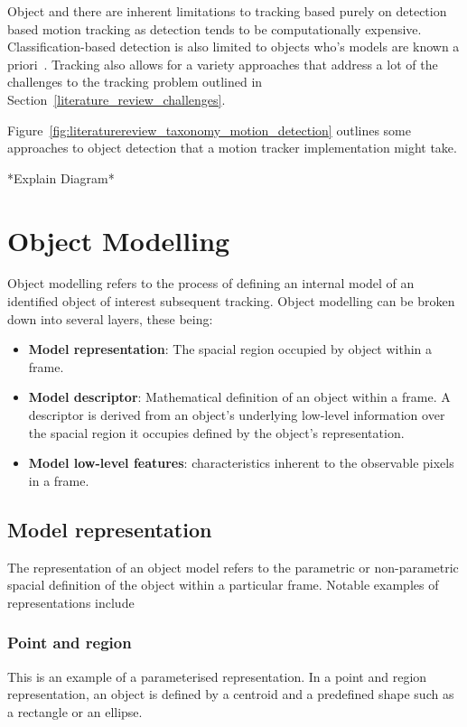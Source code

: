 Object and there are inherent limitations to tracking based purely on
detection based motion tracking as detection tends to be computationally
expensive. Classification-based detection is also limited to objects who's
models are known a priori~\cite{Forsyth2012}.
Tracking also allows for a variety approaches that address a lot of the
challenges to the tracking problem outlined in
Section~\ref{literature_review_challenges}.

Figure~\ref{fig:literaturereview_taxonomy_motion_detection} outlines some
approaches to object detection that a motion tracker implementation might take.


*Explain Diagram*

\section{Object Modelling}\label{literature_review_object_modelling}
Object modelling refers to the process of defining an internal model of
an identified object of interest subsequent tracking. Object modelling can be
broken down into several layers, these being:

\begin{itemize}
    \item \textbf{Model representation}: The spacial region occupied by object within a
        frame.
    \item \textbf{Model descriptor}: Mathematical definition of an object within
        a frame. A descriptor is derived from an object's underlying low-level information over the spacial
        region it occupies defined by the object's representation.
    \item \textbf{Model low-level features}: characteristics inherent to the
        observable pixels in a frame.
\end{itemize}

\subsection{Model representation}
The representation of an object model refers to the parametric or non-parametric
spacial definition of the object within a particular frame. Notable examples of
representations include

\subsubsection{Point and region}
This is an example of a parameterised representation. In a point and region
representation, an object is defined by a centroid and a predefined shape such
as a rectangle or an ellipse.

